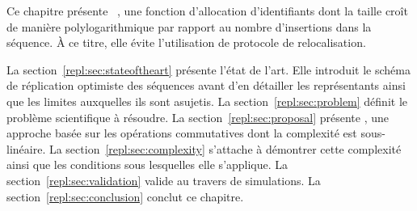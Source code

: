 Ce chapitre présente \LSEQ~\cite{nedelec2013concurrency, nedelec2013lseq}, une
fonction d'allocation d'identifiants dont la taille croît de manière
polylogarithmique par rapport au nombre d'insertions dans la séquence. À ce
titre, elle évite l'utilisation de protocole de relocalisation.

La section~\ref{repl:sec:stateoftheart} présente l'état de l'art. Elle introduit
le schéma de réplication optimiste des séquences avant d'en détailler les
représentants ainsi que les limites auxquelles ils sont asujetis.  La
section~\ref{repl:sec:problem} définit le problème scientifique à résoudre. La
section~\ref{repl:sec:proposal} présente \LSEQ, une approche basée sur les
opérations commutatives dont la complexité est sous-linéaire. La
section~\ref{repl:sec:complexity} s'attache à démontrer cette complexité ainsi
que les conditions sous lesquelles elle s'applique. La
section~\ref{repl:sec:validation} valide \LSEQ au travers de simulations. La
section~\ref{repl:sec:conclusion} conclut ce chapitre.


